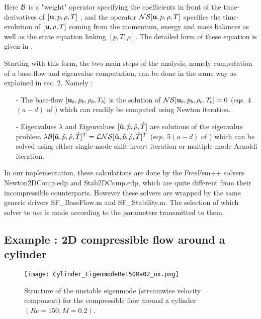 \documentclass[twocolumn,10pt]{asme2ej}
\begin{document}
Here $\cal B$ is a "weight" operator specifying the coefficients in front of the time-derivatives of $[{\bf u},p,\rho,T]$ , and the operator $ {\cal NS}  [{\bf u},p,\rho,T] $ specifies the time-evolution of  $[{\bf u},\rho,T]$ coming from the momentum, energy and mass balances as well as the state equation linking $[p,T,\rho]$. The detailed form of these equation is given in \cite{Fani2018}. 

Starting with this form, the two main steps of the analysis, namely computation of a base-flow and eigenvalue computation, can be done in the same way as explained in sec. 2. Namely :
\begin{itemize}
\item[-] The base-flow $[{\bf u}_b,p_b,\rho_b,T_b]$ is the solution of ${\cal NS}  [{\bf u}_b,p_b,\rho_b,T_b]=0$ (eqs. 4$(a-d)$ of  \cite{Fani2018}) which can readily be computed using Newton iteration.
\item[-] Eigenvalues $\lambda$ and Eigenvalues $[\hat{{\bf u}},\hat{p},\hat{\rho},\hat{T}]$ are solutions of the eigenvalue problem $\lambda {\cal B}  [\hat{{\bf u}},\hat{p},\hat{\rho},\hat{T}]^T = {\cal LNS} [\hat{{\bf u}},\hat{p},\hat{\rho},\hat{T}]^T $ (eqs. 5$(a-d)$ of  \cite{Fani2018}) which can be solved using either single-mode shift-invert iteration or multiple-mode Arnoldi iteration.
\end{itemize}

In our implementation, these calculations are done by the FreeFem++ solvers {\sf  Newton2DComp.edp} and {\sf  Stab2DComp.edp}, which are quite different from their incompressible counterparts. However these solvers are wrapped by the same generic drivers {\sf  SF\_BaseFlow.m}  and {\sf  SF\_Stability.m}. The selection of which solver to use is made according to the parameters transmitted to them. 

\subsection{Example : 2D compressible flow around a cylinder}

 \begin{figure}
\texttt{[image: Cylinder\_EigenmodeRe150Ma02\_ux.png]}
\caption{Structure of the unstable eigenmode (streamwise velocity component) for the compressible flow around a cylinder  $(Re= 150,M=0.2)$.}
\label{fig:compcyl_ux} 
\end{figure}
\end{document}
